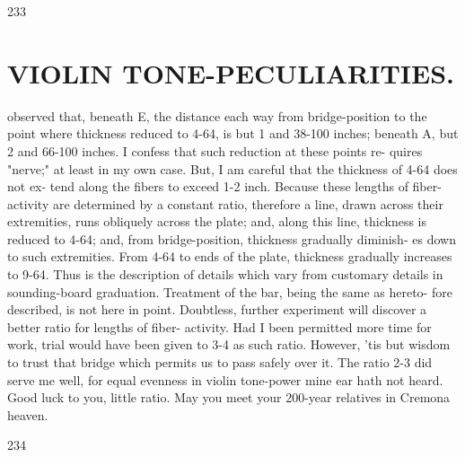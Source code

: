 \documentclass{article}
\begin{document}
233

\section*{VIOLIN TONE-PECULIARITIES.}
observed that, beneath E, the distance each way from bridge-position to the point where thickness reduced to 4-64, is but 1 and 38-100 inches; beneath A, but 2 and 66-100 inches. I confess that such reduction at these points re- quires "nerve;" at least in my own case. But, I am careful that the thickness of 4-64 does not ex- tend along the fibers to exceed 1-2 inch. Because these lengths of fiber-activity are determined by a constant ratio, therefore a line, drawn across their extremities, runs obliquely across the plate; and, along this line, thickness is reduced to 4-64; and, from bridge-position, thickness gradually diminish- es down to such extremities. From 4-64 to ends of the plate, thickness gradually increases to 9-64. Thus is the description of details which vary from customary details in sounding-board graduation. Treatment of the bar, being the same as hereto- fore described, is not here in point. Doubtless, further experiment will discover a better ratio for lengths of fiber- activity. Had I been permitted more time for work, trial would have been given to 3-4 as such ratio. However, 'tis but wisdom to trust that bridge which permits us to pass safely over it. The ratio 2-3 did serve me well, for equal evenness in violin tone-power mine ear hath not heard. Good luck to you, little ratio. May you meet your 200-year relatives in Cremona heaven.

234
\end{document}

